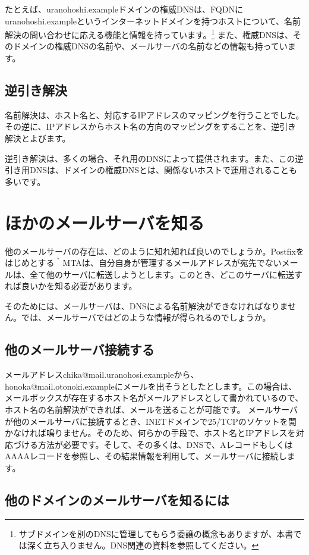 たとえば、uranohoshi.exampleドメインの権威DNSは、FQDNにuranohoshi.exampleというインターネットドメインを持つホストについて、名前解決の問い合わせに応える機能と情報を持っています。\footnote{サブドメインを別のDNSに管理してもらう委譲の概念もありますが、本書では深く立ち入りません。DNS関連の資料を参照してください。}
また、権威DNSは、そのドメインの権威DNSの名前や、メールサーバの名前などの情報も持っています。

\subsection{逆引き解決}
名前解決は、ホスト名と、対応するIPアドレスのマッピングを行うことでした。その逆に、IPアドレスからホスト名の方向のマッピングをすることを、逆引き解決とよびます。

逆引き解決は、多くの場合、それ用のDNSによって提供されます。また、この逆引き用DNSは、ドメインの権威DNSとは、関係ないホストで運用されることも多いです。

\section{ほかのメールサーバを知る}

他のメールサーバの存在は、どのように知れ知れば良いのでしょうか。Postfixをはじめとする｀MTAは、自分自身が管理するメールアドレスが宛先でないメールは、全て他のサーバに転送しようとします。このとき、どこのサーバに転送すれば良いかを知る必要があります。

そのためには、メールサーバは、DNSによる名前解決ができなければなりません。では、メールサーバではどのような情報が得られるのでしょうか。

\subsection{他のメールサーバ接続する}
メールアドレスchika@mail.uranohosi.exampleから、honoka@mail.otonoki.exampleにメールを出そうとしたとします。この場合は、メールボックスが存在するホスト名がメールアドレスとして書かれているので、ホスト名の名前解決ができれば、メールを送ることが可能です。
メールサーバが他のメールサーバに接続するとき、INETドメインで25/TCPのソケットを開かなければ鳴りません。そのため、何らかの手段で、ホスト名とIPアドレスを対応づける方法が必要です。そして、その多くは、DNSで、AレコードもしくはAAAAレコードを参照し、その結果情報を利用して、メールサーバに接続します。

\subsection{他のドメインのメールサーバを知るには}

